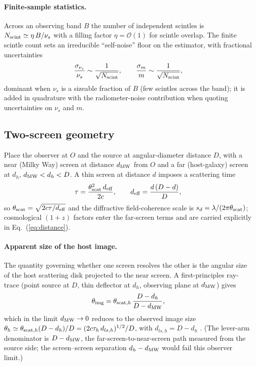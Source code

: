 \paragraph{Finite-sample statistics.}
Across an observing band $B$ the number of independent scintles is
$N_{\rm scint}\simeq\eta\,B/\nu_{s}$ with a filling factor $\eta=\mathcal{O}(1)$
for scintle overlap. The finite scintle count sets an irreducible
``self-noise'' floor on the estimator, with fractional uncertainties
%
\begin{equation}
\frac{\sigma_{\nu_{s}}}{\nu_{s}} \sim \frac{1}{\sqrt{N_{\rm scint}}},
\qquad
\frac{\sigma_{m}}{m} \sim \frac{1}{\sqrt{N_{\rm scint}}},
\label{eq:selfnoise}
\end{equation}
%
dominant when $\nu_{s}$ is a sizeable fraction of $B$ (few scintles across the
band); it is added in quadrature with the radiometer-noise contribution when
quoting uncertainties on $\nu_{s}$ and $m$.

\subsection{Two-screen geometry}
\label{app:geometry}

Place the observer at $O$ and the source at angular-diameter distance $D$, with
a near (Milky Way) screen at distance $d_{\rm MW}$ from $O$ and a far
(host-galaxy) screen at $d_{h}$, $d_{\rm MW}<d_{h}<D$. A thin screen at
distance $d$ imposes a scattering time
%
\begin{equation}
\tau = \frac{\theta_{\rm scat}^{2}\,d_{\rm eff}}{2c},
\qquad
d_{\rm eff} = \frac{d\,(D-d)}{D},
\label{eq:tau}
\end{equation}
%
so $\theta_{\rm scat}=\sqrt{2c\tau/d_{\rm eff}}$ and the diffractive
field-coherence scale is $s_{d}=\lambda/(2\pi\theta_{\rm scat})$; cosmological
$(1+z)$ factors enter the far-screen terms and are carried explicitly in
Eq.~(\ref{eq:distance}).

\paragraph{Apparent size of the host image.}
The quantity governing whether one screen resolves the other is the angular
size of the host scattering disk projected to the near screen. A
first-principles ray-trace (point source at $D$, thin deflector at $d_{h}$,
observing plane at $d_{\rm MW}$) gives
%
\begin{equation}
\theta_{\rm img}
  = \theta_{{\rm scat},h}\,\frac{D-d_{h}}{D-d_{\rm MW}} ,
\label{eq:thimg}
\end{equation}
%
which in the limit $d_{\rm MW}\to0$ reduces to the observed image size
$\theta_{h}\simeq\theta_{{\rm scat},h}(D-d_{h})/D=(2c\tau_{h}\,d_{ls,h})^{1/2}/D$,
with $d_{ls,h}=D-d_{h}$ \citep{Masui2015}. (The lever-arm denominator is
$D-d_{\rm MW}$, the far-screen-to-near-screen path measured from the source
side; the screen--screen separation $d_{h}-d_{\rm MW}$ would fail this
observer limit.)

